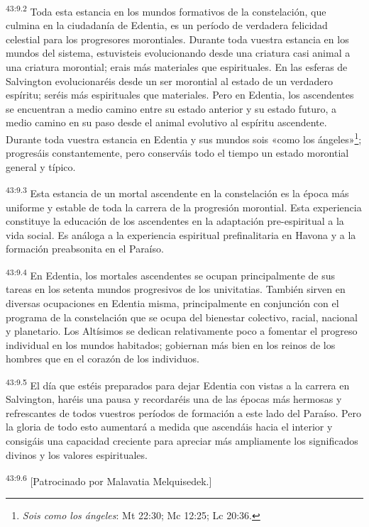 \par
\textsuperscript{43:9.2} Toda esta estancia en los mundos formativos de la constelación, que culmina en la ciudadanía de Edentia, es un período de verdadera felicidad celestial para los progresores morontiales. Durante toda vuestra estancia en los mundos del sistema, estuvisteis evolucionando desde una criatura casi animal a una criatura morontial; erais más materiales que espirituales. En las esferas de Salvington evolucionaréis desde un ser morontial al estado de un verdadero espíritu; seréis más espirituales que materiales. Pero en Edentia, los ascendentes se encuentran a medio camino entre su estado anterior y su estado futuro, a medio camino en su paso desde el animal evolutivo al espíritu ascendente. Durante toda vuestra estancia en Edentia y sus mundos sois «como los ángeles»\footnote{\textit{Sois como los ángeles}: Mt 22:30; Mc 12:25; Lc 20:36.}; progresáis constantemente, pero conserváis todo el tiempo un estado morontial general y típico.

\par
\textsuperscript{43:9.3} Esta estancia de un mortal ascendente en la constelación es la época más uniforme y estable de toda la carrera de la progresión morontial. Esta experiencia constituye la educación de los ascendentes en la adaptación pre-espiritual a la vida social. Es análoga a la experiencia espiritual prefinalitaria en Havona y a la formación preabsonita en el Paraíso.

\par
\textsuperscript{43:9.4} En Edentia, los mortales ascendentes se ocupan principalmente de sus tareas en los setenta mundos progresivos de los univitatias. También sirven en diversas ocupaciones en Edentia misma, principalmente en conjunción con el programa de la constelación que se ocupa del bienestar colectivo, racial, nacional y planetario. Los Altísimos se dedican relativamente poco a fomentar el progreso individual en los mundos habitados; gobiernan más bien en los reinos de los hombres que en el corazón de los individuos.

\par
\textsuperscript{43:9.5} El día que estéis preparados para dejar Edentia con vistas a la carrera en Salvington, haréis una pausa y recordaréis una de las épocas más hermosas y refrescantes de todos vuestros períodos de formación a este lado del Paraíso. Pero la gloria de todo esto aumentará a medida que ascendáis hacia el interior y consigáis una capacidad creciente para apreciar más ampliamente los significados divinos y los valores espirituales.

\par
\textsuperscript{43:9.6} [Patrocinado por Malavatia Melquisedek.]